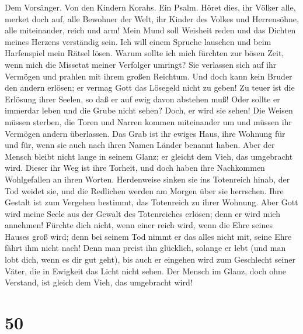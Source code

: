  Dem Vorsänger. Von den Kindern Korahs. Ein Psalm. Höret
dies, ihr Völker alle, merket doch auf, alle Bewohner der Welt,
 ihr Kinder des Volkes und Herrensöhne, alle miteinander,
reich und arm!  Mein Mund soll Weisheit reden und das
Dichten meines Herzens verständig sein.  Ich will einem
Spruche lauschen und beim Harfenspiel mein Rätsel lösen. 
Warum sollte ich mich fürchten zur bösen Zeit, wenn mich die Missetat
meiner Verfolger umringt?  Sie verlassen sich auf ihr
Vermögen und prahlen mit ihrem großen Reichtum.  Und doch
kann kein Bruder den andern erlösen; er vermag Gott das Lösegeld nicht
zu geben!  Zu teuer ist die Erlösung ihrer Seelen, so daß
er auf ewig davon abstehen muß!  Oder sollte er immerdar
leben und die Grube nicht sehen?  Doch, er wird sie
sehen! Die Weisen müssen sterben, die Toren und Narren kommen
miteinander um und müssen ihr Vermögen andern überlassen.
 Das Grab ist ihr ewiges Haus, ihre Wohnung für und für,
wenn sie auch nach ihren Namen Länder benannt haben. 
Aber der Mensch bleibt nicht lange in seinem Glanz; er gleicht dem Vieh,
das umgebracht wird.  Dieser ihr Weg ist ihre Torheit,
und doch haben ihre Nachkommen Wohlgefallen an ihren Worten.
 Herdenweise sinken sie ins Totenreich hinab, der Tod
weidet sie, und die Redlichen werden am Morgen über sie herrschen. Ihre
Gestalt ist zum Vergehen bestimmt, das Totenreich zu ihrer Wohnung.
 Aber Gott wird meine Seele aus der Gewalt des
Totenreiches erlösen; denn er wird mich annehmen! 
Fürchte dich nicht, wenn einer reich wird, wenn die Ehre seines Hauses
groß wird;  denn bei seinem Tod nimmt er das alles nicht
mit, seine Ehre fährt ihm nicht nach!  Denn man preist
ihn glücklich, solange er lebt (und man lobt dich, wenn es dir gut
geht),  bis auch er eingehen wird zum Geschlecht seiner
Väter, die in Ewigkeit das Licht nicht sehen.  Der Mensch
im Glanz, doch ohne Verstand, ist gleich dem Vieh, das umgebracht wird!

\hypertarget{section-49}{%
\section{50}\label{section-49}}

